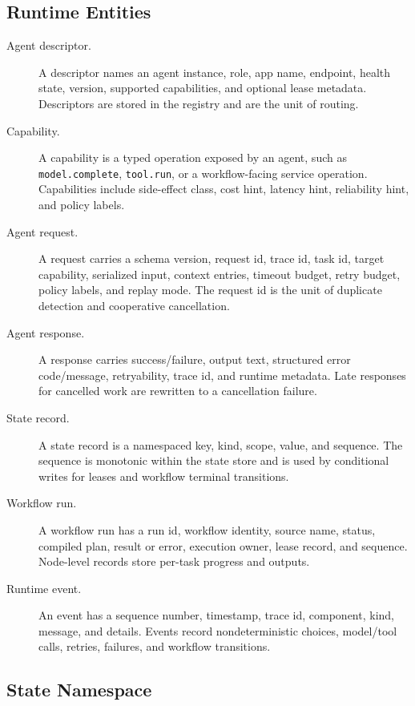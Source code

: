 \documentclass[manuscript,screen,review]{acmart}
\begin{document}
\subsection{Runtime Entities}

\begin{description}
  \item[Agent descriptor.] A descriptor names an agent instance, role, app name,
  endpoint, health state, version, supported capabilities, and optional lease
  metadata. Descriptors are stored in the registry and are the unit of routing.
  \item[Capability.] A capability is a typed operation exposed by an agent, such
  as \texttt{model.complete}, \texttt{tool.run}, or a workflow-facing service
  operation. Capabilities include side-effect class, cost hint, latency hint,
  reliability hint, and policy labels.
  \item[Agent request.] A request carries a schema version, request id, trace id,
  task id, target capability, serialized input, context entries, timeout budget,
  retry budget, policy labels, and replay mode. The request id is the unit of
  duplicate detection and cooperative cancellation.
  \item[Agent response.] A response carries success/failure, output text,
  structured error code/message, retryability, trace id, and runtime metadata.
  Late responses for cancelled work are rewritten to a cancellation failure.
  \item[State record.] A state record is a namespaced key, kind, scope, value,
  and sequence. The sequence is monotonic within the state store and is used by
  conditional writes for leases and workflow terminal transitions.
  \item[Workflow run.] A workflow run has a run id, workflow identity, source
  name, status, compiled plan, result or error, execution owner, lease record,
  and sequence. Node-level records store per-task progress and outputs.
  \item[Runtime event.] An event has a sequence number, timestamp, trace id,
  component, kind, message, and details. Events record nondeterministic choices,
  model/tool calls, retries, failures, and workflow transitions.
\end{description}

\subsection{State Namespace}
\end{document}
